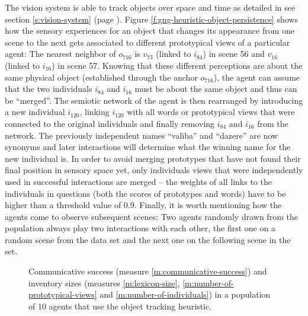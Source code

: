 The vision system is able to track objects over space and time as
detailed in see section \ref{s:vision-system} (page
\pageref{s:vision-system}). Figure
\ref{f:gng-heuristic-object-persistence} shows how the sensory
experiences for an object that changes its appearance from one scene
to the next gets associated to different prototypical views of a
particular agent: The nearest neighbor of $o_{716}$ is $v_{73}$
(linked to $i_{84}$) in scene 56 and $v_{16}$ (linked to $i_{16}$) in
scene 57. Knowing that these different perceptions are about the same
physical object (established through the anchor $o_{716}$), the agent
can assume that the two individuals $i_{84}$ and $i_{16}$ must be
about the same object and thus can be ``merged''. The semiotic network
of the agent is then rearranged by introducing a new individual
$i_{120}$, linking $i_{120}$ with all words or prototypical views that
were connected to the original individuals and finally removing
$i_{84}$ and $i_{16}$ from the network. The previously independent
names ``valiba'' and ``dazere'' are now synonyms and later
interactions will determine what the winning name for the new
individual is. In order to avoid merging prototypes that have not
found their final position in sensory space yet, only individuals
views that were independently used in successful interactions are
merged -- the weights of all links to the individuals in questions
(both the scores of prototypes and words) have to be higher than a
threshold value of 0.9. Finally, it is worth mentioning how the agents
come to observe subsequent scenes: Two agents randomly drawn from the
population always play two interactions with each other, the first one
on a random scene from the data set and the next one on the following
scene in the set.

\begin{figure}[t]
  \caption{Commun\-icative success (measure
    \ref{m:communicative-success}) and inventory sizes (measures
    \ref{m:lexicon-size}, \ref{m:number-of-prototypical-views} and
    \ref{m:number-of-individuals}) in a population of 10 agents that
    use the object tracking heuristic. }
  \label{f:gng-results-with-object-tracking-heuristic}
\end{figure}


